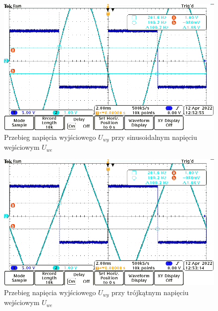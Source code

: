 \clearpage
\begin{figure}[H]
    \centering
    \includegraphics[width=\textwidth]{include/4/1.png}
    \caption{Przebieg napięcia wyjściowego \(U_{wy}\) przy sinusoidalnym napięciu wejściowym \(U_{we}\)}
\end{figure}

\begin{figure}[H]
    \centering
    \includegraphics[width=\textwidth]{include/4/2.png}
    \caption{Przebieg napięcia wyjściowego \(U_{wy}\) przy trójkątnym napięciu wejściowym \(U_{we}\)}
\end{figure}
